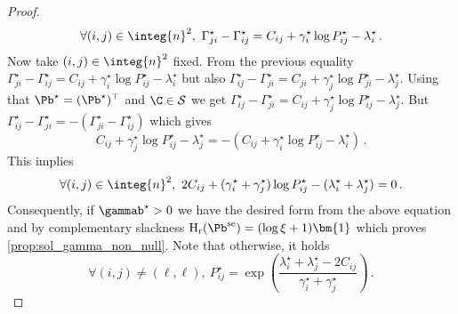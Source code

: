 \begin{proof}
\begin{equation}
\forall (i,j) \in \integ{n}^2, \ \Gamma^\star_{ji}-\Gamma^\star_{ij} =  C_{ij}+\gamma^\star_i \log P^\star_{ij}-\lambda^\star_i\,.
\end{equation}
Now take $(i,j) \in \integ{n}^2$ fixed. From the previous equality 
$\Gamma^\star_{ji}-\Gamma^\star_{ij} =  C_{ij}+\gamma^\star_i \log P^\star_{ij}-\lambda^\star_i$ but also $\Gamma^\star_{ij}-\Gamma^\star_{ji} =  C_{ji}+\gamma^\star_j \log P^\star_{ji}-\lambda^\star_j$. Using that $\Pb^\star=(\Pb^{\star})^{\top}$ and $\C \in \mathcal{S}$ we get $\Gamma^\star_{ij}-\Gamma^\star_{ji} =  C_{ij}+\gamma^\star_j \log P^\star_{ij}-\lambda^\star_j$. But $\Gamma^\star_{ij}-\Gamma^\star_{ji} = -(\Gamma^\star_{ji}-\Gamma^\star_{ij})$ which gives
\begin{equation}
C_{ij}+\gamma^\star_j \log P^\star_{ij}-\lambda^\star_j =  -(C_{ij}+\gamma^\star_i \log P^\star_{ij}-\lambda^\star_i)\,.
\end{equation}
This implies
\begin{equation}
\forall (i,j) \in \integ{n}^2, \ 2C_{ij}+(\gamma^\star_i+\gamma^\star_j) \log P^\star_{ij}-(\lambda^\star_i+ \lambda^\star_j) =  0\,.
\end{equation}
Consequently, if $\gammab^\star > 0$ we have the desired form from the above equation and by complementary slackness $\operatorname{H}_{\mathrm{r}}(\Pb^{\mathrm{se}}) = (\log \xi + 1)\bm{1}$ which proves \cref{prop:sol_gamma_non_null}. Note that otherwise, it holds
\begin{equation}
\forall (i,j) \neq (\ell, \ell), \ P_{ij}^\star = \exp \left(\frac{\lambda^\star_i+ \lambda^\star_j-2C_{ij}}{\gamma^\star_i+\gamma^\star_j}\right)\,.
\end{equation}

\end{proof}





